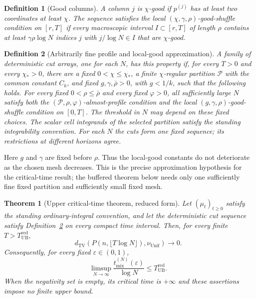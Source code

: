 \documentclass[11pt]{article}
\numberwithin{equation}{section}
\newtheorem{theorem}{Theorem}[section]
\newtheorem{definition}[definition]{Definition}
\newcommand{\TV}{\mathrm{TV}}
\newcommand{\Unif}{\mathrm{Unif}}
\newcommand{\1}{\mathbf 1}
\newcommand{\nuUnif}{\nu_{\Unif}}
\newcommand{\UB}{\mathrm{UB}}
\begin{document}
\begin{definition}[Good columns]
\label{def:good-columns}
A column $j$ is $\chi$-good if $p^{(j)}$ has at least two coordinates at least $\chi$. The sequence satisfies the local $(\chi,\gamma,\rho)$-good-shuffle condition on $[r,T]$ if every macroscopic interval $I\subset[r,T]$ of length $\rho$ contains at least $\gamma\rho\log N$ indices $j$ with $j/\log N\in I$ that are $\chi$-good.
\end{definition}

\begin{definition}[Arbitrarily fine profile and local-good approximation]
\label{def:ub-arbitrarily-fine-approximation}
A family of deterministic cut arrays, one for each $N$, has this property if, for every
$T>0$ and every $\chi_*>0$, there are a fixed
$0<\chi\le\chi_*$, a finite $\chi$-regular partition $\mathcal P$ with
the common constant $C_k$, and fixed $g,\gamma,\bar\rho>0$, with
$g<1/k$, such that the following holds.  For every fixed
$0<\rho\le\bar\rho$ and every fixed $\varphi>0$, all sufficiently
large $N$ satisfy both the $(\mathcal P,\rho,\varphi)$-almost-profile
condition and the local $(g,\gamma,\rho)$-good-shuffle condition on
$[0,T]$.  The threshold in $N$ may depend on these fixed choices.
The scalar cell integrands of the selected partition satisfy the
standing integrability convention.  For each $N$ the cuts form one
fixed sequence; its restrictions at different horizons agree.
\end{definition}

Here $g$ and $\gamma$ are fixed before $\rho$. Thus the local-good
constants do not deteriorate as the chosen mesh decreases. This is
the precise approximation hypothesis for the critical-time result;
the buffered theorem below needs only one sufficiently fine fixed
partition and sufficiently small fixed mesh.

\begin{theorem}[Upper critical-time theorem, reduced form]
\label{thm:upper-critical-reduced}
Let $(\mu_t)_{t\ge0}$ satisfy the standing ordinary-integral convention,
and let the deterministic cut sequence satisfy
Definition~\ref{def:ub-arbitrarily-fine-approximation} on every compact
time interval.  Then, for every finite $T>T_{\UB}^{\mathrm{red}}$,
\[
 d_{\TV}(P(n,\lfloor T\log N\rfloor),\nuUnif)\longrightarrow0.
\]
Consequently, for every fixed $\varepsilon\in(0,1)$,
\[
 \limsup_{N\to\infty}
 \frac{t_{\mathrm{mix}}^{(N)}(\varepsilon)}{\log N}
 \le T_{\UB}^{\mathrm{red}}.
\]
When the negativity set is empty, its critical time is $+\infty$ and
these assertions impose no finite upper bound.
\end{theorem}
\end{document}
